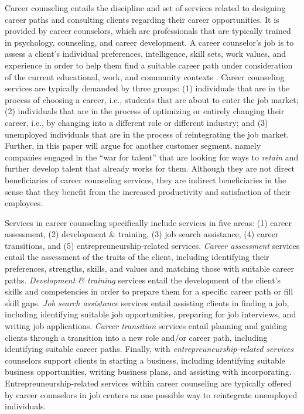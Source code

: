 Career counseling entails the discipline and set of services related to designing career paths and consulting
clients regarding their career opportunities. It is provided by career counselors, which are professionals that
are typically trained in psychology, counseling, and career development. A career counselor's job is to assess 
a client's individual preferences, intelligence, skill sets, work values, and experience in order to help them
find a suitable career path under consideration of the current educational, work, and community contexts
\citep{americanpsychologicalassociationCareerCounseling}. Career counseling services are typically demanded by
three groups: (1) individuals that are in the process of choosing a career, i.e., students that are about to enter
the job market; (2) individuals that are in the process of optimizing or entirely changing their career, i.e.,
by changing into a different role or different industry; and (3) unemployed individuals that are in the process
of reintegrating the job market. Further, in this paper will argue for another customer segment, namely companies
engaged in the ``war for talent'' that are looking for ways to \textit{retain} and further develop talent that
already works for them. Although they are not direct beneficiaries of career counseling services, they are
indirect beneficiaries in the sense that they benefit from the increased productivity and satisfaction of their
employees.

Services in career counseling specifically include services in five areas: (1) career assessment, (2) development
\& training, (3) job search assistance, (4) career transitions, and (5) entrepreuneurship-related services.
\textit{Career assessment} services entail the assessment of the traits of the client, including identifying their
preferences, strengths, skills, and values and matching those with suitable career paths. \textit{Development
\& training} services entail the development of the client's skills and competencies in order to prepare them
for a specific career path or fill skill gaps. \textit{Job search assistance} services entail assisting clients
in finding a job, including identifying suitable job opportunities, preparing for job interviews, and writing
job applications. \textit{Career transition} services entail planning and guiding clients through a transition
into a new role and/or career path, including identifying suitable career paths. Finally, with
\textit{entrepreuneurship-related services} counselors support clients in starting a business, including identifying
suitable business opportunities, writing business plans, and assisting with incorporating. Entrepreuneurship-related
services within career counseling are typically offered by career counselors in job centers as one possible way to
reintegrate unemployed individuals.


